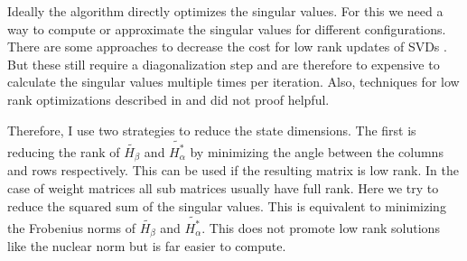 \documentclass[doctype=mastersthesis,BCOR=15mm,biblatex]{ldvbook}%
\begin{document}
Ideally the algorithm directly optimizes the singular values.
For this we need a way to compute or approximate the singular values for different configurations. 
There are some approaches to decrease the cost for low rank updates of SVDs \cite{brand_fast_2006}.
But these still require a diagonalization step and are therefore to expensive to calculate the singular values multiple times per iteration.
Also, techniques for low rank optimizations described in \cite{liu_interior-point_2010} and \cite{recht_guaranteed_2010} did not proof helpful.

Therefore, I use two strategies to reduce the state dimensions.
The first is reducing the rank of $\tilde{H_\beta}$ and $\tilde{H_\alpha^*}$ by minimizing the angle between the columns and rows respectively.
This can be used if the resulting matrix is low rank.
In the case of weight matrices all sub matrices usually have full rank.
Here we try to reduce the squared sum of the singular values.
This is equivalent to minimizing the Frobenius norms of $\tilde{H_\beta}$ and $\tilde{H_\alpha^*}$.
This does not promote low rank solutions like the nuclear norm but is far easier to compute.
\end{document}
